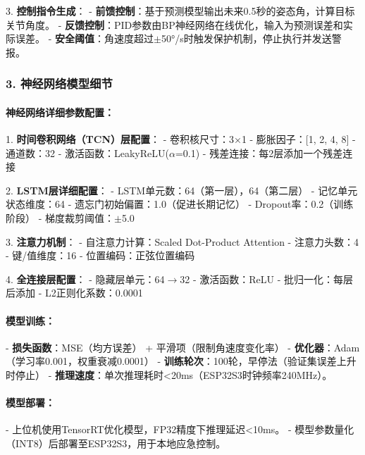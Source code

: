 \documentclass[12pt, a4paper]{article}
\begin{document}
3. \textbf{控制指令生成}：
   - \textbf{前馈控制}：基于预测模型输出未来0.5秒的姿态角，计算目标关节角度。
   - \textbf{反馈控制}：PID参数由BP神经网络在线优化，输入为预测误差和实际误差。
   - \textbf{安全阈值}：角速度超过$\pm$50°/s时触发保护机制，停止执行并发送警报。

\subsubsection{3. 神经网络模型细节}

\begin{center}
\end{center}

\paragraph{神经网络详细参数配置：}

1. \textbf{时间卷积网络（TCN）层配置}：
   - 卷积核尺寸：3×1
   - 膨胀因子：[1, 2, 4, 8]
   - 通道数：32
   - 激活函数：LeakyReLU($\alpha$=0.1)
   - 残差连接：每2层添加一个残差连接

2. \textbf{LSTM层详细配置}：
   - LSTM单元数：64（第一层），64（第二层）
   - 记忆单元状态维度：64
   - 遗忘门初始偏置：1.0（促进长期记忆）
   - Dropout率：0.2（训练阶段）
   - 梯度裁剪阈值：$\pm$5.0

3. \textbf{注意力机制}：
   - 自注意力计算：Scaled Dot-Product Attention
   - 注意力头数：4
   - 键/值维度：16
   - 位置编码：正弦位置编码

4. \textbf{全连接层配置}：
   - 隐藏层单元：64$\rightarrow$32
   - 激活函数：ReLU
   - 批归一化：每层后添加
   - L2正则化系数：0.0001

\paragraph{模型训练：}
- \textbf{损失函数}：MSE（均方误差） + 平滑项（限制角速度变化率）
- \textbf{优化器}：Adam（学习率0.001，权重衰减0.0001）
- \textbf{训练轮次}：100轮，早停法（验证集误差上升时停止）
- \textbf{推理速度}：单次推理耗时<20ms（ESP32S3时钟频率240MHz）。

\paragraph{模型部署：}
- 上位机使用TensorRT优化模型，FP32精度下推理延迟<10ms。
- 模型参数量化（INT8）后部署至ESP32S3，用于本地应急控制。
\end{document}
